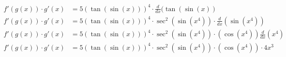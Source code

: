 \documentclass[preview]{standalone}
\begin{document}
\begin{align*}
f'(g(x)) \cdot g'(x)&=5(\tan(\sin(x)))^4 \cdot \frac{d}{dx}(\tan(\sin(x)) \\ f'(g(x))\cdot g'(x)&=5(\tan(\sin(x)))^4 \cdot \sec^2(\sin(x^4)) \cdot \frac{d}{dx}(\sin(x^4)) \\ f'(g(x))\cdot g'(x)&=5(\tan(\sin(x)))^4 \cdot \sec^2(\sin(x^4)) \cdot (\cos(x^4)) \frac{d}{dx}(x^4) \\ f'(g(x))\cdot g'(x)&=5(\tan(\sin(x)))^4 \cdot \sec^2(\sin(x^4)) \cdot (\cos(x^4)) \cdot 4x^3
\end{align*}
\end{document}
